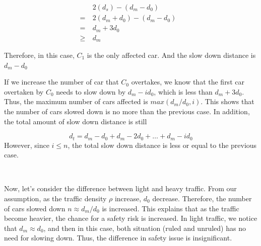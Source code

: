 \begin{align}
&2(d_s)-(d_m-d_0)&\\
=\ &2(d_m+d_0)-(d_m-d_0)&\\
=\ &d_m+3d_0&\\
\ge \ &d_m&
\end{align}

Therefore, in this case, $C_1$ is the only affected car. And the slow down distance is $d_m-d_0$

If we increase the number of car that $C_0$ overtakes, we know that the first car overtaken by $C_0$ needs to slow down by $d_m-id_0$, which is less than $d_m+3d_0$. Thus, the maximum number of cars affected is $max(d_m/d_0, i)$. This shows that the number of cars slowed down is no more than the previous case. In addition, the total amount of slow down distance is still

\begin{equation}
d_t = d_m-d_0 + d_m-2d_0 + \dots + d_m - id_0 
\end{equation}
However, since $i\le n$, the total slow down distance is less or equal to the previous case. 


\

Now, let's consider the difference between light and heavy traffic. From our assumption, as the traffic density $\rho$ increase, $d_0$ decrease. Therefore, the number of cars slowed down $n\approx d_m/d_0$ is increased. This explains that as the traffic become heavier, the chance for a safety risk is increased. In light traffic, we notice that $d_m \approx d_0$, and then in this case, both situation (ruled and unruled) has no need for slowing down. Thus, the difference in safety issue is insignificant. 